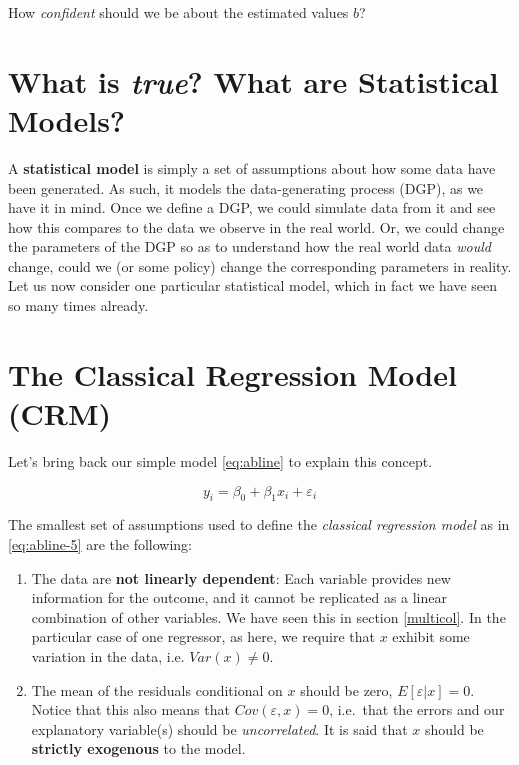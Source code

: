 \documentclass[]{book}
\providecommand{\tightlist}{%
  \setlength{\itemsep}{0pt}\setlength{\parskip}{0pt}}
\newenvironment{note}{\begin{tcolorbox}[colback=blue!5!white,colframe=blue!75!black]}{\end{tcolorbox}}
\begin{document}
\begin{note}
How \emph{confident} should we be about the estimated values \(b\)?
\end{note}

\hypertarget{what-is-true-what-are-statistical-models}{%
\section{\texorpdfstring{What is \emph{true}? What are Statistical Models?}{What is true? What are Statistical Models?}}\label{what-is-true-what-are-statistical-models}}

A \textbf{statistical model} is simply a set of assumptions about how some data have been generated. As such, it models the data-generating process (DGP), as we have it in mind. Once we define a DGP, we could simulate data from it and see how this compares to the data we observe in the real world. Or, we could change the parameters of the DGP so as to understand how the real world data \emph{would} change, could we (or some policy) change the corresponding parameters in reality. Let us now consider one particular statistical model, which in fact we have seen so many times already.

\hypertarget{class-reg}{%
\section{The Classical Regression Model (CRM)}\label{class-reg}}

Let's bring back our simple model \eqref{eq:abline} to explain this concept.

\begin{equation}
y_i = \beta_0 + \beta_1 x_i + \varepsilon_i \label{eq:abline-5}
\end{equation}

The smallest set of assumptions used to define the \emph{classical regression model} as in \eqref{eq:abline-5} are the following:

\begin{enumerate}
\def\labelenumi{\arabic{enumi}.}
\tightlist
\item
  The data are \textbf{not linearly dependent}: Each variable provides new information for the outcome, and it cannot be replicated as a linear combination of other variables. We have seen this in section \ref{multicol}. In the particular case of one regressor, as here, we require that \(x\) exhibit some variation in the data, i.e. \(Var(x)\neq 0\).
\item
  The mean of the residuals conditional on \(x\) should be zero, \(E[\varepsilon|x] = 0\). Notice that this also means that \(Cov(\varepsilon,x) = 0\), i.e.~that the errors and our explanatory variable(s) should be \emph{uncorrelated}. It is said that \(x\) should be \textbf{strictly exogenous} to the model.
\end{enumerate}
\end{document}
